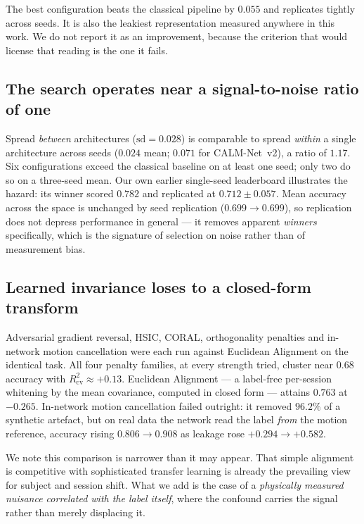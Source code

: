 \documentclass[conference]{IEEEtran}
\begin{document}
The best configuration beats the classical pipeline by $0.055$ and replicates tightly
across seeds. It is also the leakiest representation measured anywhere in this work. We
do not report it as an improvement, because the criterion that would license that
reading is the one it fails.

\subsection{The search operates near a signal-to-noise ratio of one}

Spread \emph{between} architectures ($\mathrm{sd} = 0.028$) is comparable to spread
\emph{within} a single architecture across seeds ($0.024$ mean; $0.071$ for
CALM-Net~v2), a ratio of $1.17$. Six configurations exceed the classical baseline on at
least one seed; only two do so on a three-seed mean. Our own earlier single-seed
leaderboard illustrates the hazard: its winner scored $0.782$ and replicated at
$0.712 \pm 0.057$. Mean accuracy across the space is unchanged by seed replication
($0.699 \rightarrow 0.699$), so replication does not depress performance in general ---
it removes apparent \emph{winners} specifically, which is the signature of selection on
noise rather than of measurement bias.

\subsection{Learned invariance loses to a closed-form transform}

Adversarial gradient reversal, HSIC, CORAL, orthogonality penalties and in-network
motion cancellation were each run against Euclidean Alignment on the identical task.
All four penalty families, at every strength tried, cluster near $0.68$ accuracy with
$R^2_{\mathrm{cv}} \approx +0.13$. Euclidean Alignment --- a label-free per-session
whitening by the mean covariance, computed in closed form --- attains $0.763$ at
$-0.265$. In-network motion cancellation failed outright: it removed $96.2\%$ of a
synthetic artefact, but on real data the network read the label \emph{from} the motion
reference, accuracy rising $0.806 \rightarrow 0.908$ as leakage rose
$+0.294 \rightarrow +0.582$.

We note this comparison is narrower than it may appear. That simple alignment is
competitive with sophisticated transfer learning is already the prevailing view for
subject and session shift. What we add is the case of a \emph{physically measured
nuisance correlated with the label itself}, where the confound carries the signal
rather than merely displacing it.
\end{document}
